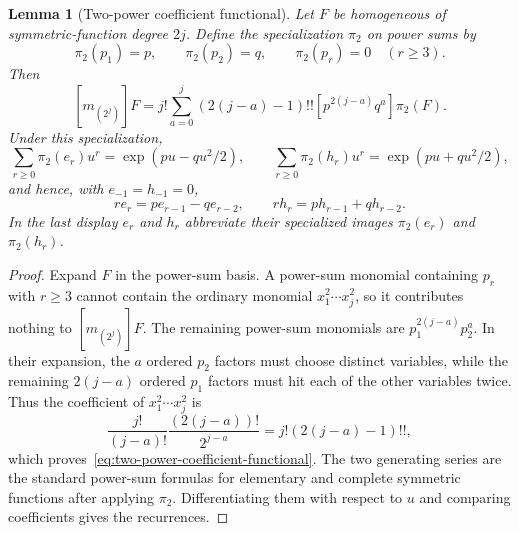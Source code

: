 \documentclass[11pt,reqno]{amsart}
\theoremstyle{plain}
\newtheorem{lemma}[theorem]{Lemma}
\theoremstyle{definition}
\begin{document}
\begin{lemma}[Two-power coefficient functional]
\label{lem:two-power-coefficient-functional}
Let $F$ be homogeneous of symmetric-function degree $2j$.  Define the
specialization $\pi_2$ on power sums by
\[
 \pi_2(p_1)=p,\qquad \pi_2(p_2)=q,\qquad
 \pi_2(p_r)=0\quad(r\geq3).
\]
Then
\begin{equation}
\label{eq:two-power-coefficient-functional}
 [m_{(2^j)}]F
 =j!\sum_{a=0}^{j}(2(j-a)-1)!!
 [p^{2(j-a)}q^a]\pi_2(F).
\end{equation}
Under this specialization,
\[
 \sum_{r\geq0}\pi_2(e_r)u^r
 =\exp(pu-qu^2/2),\qquad
 \sum_{r\geq0}\pi_2(h_r)u^r
 =\exp(pu+qu^2/2),
\]
and hence, with $e_{-1}=h_{-1}=0$,
\[
 r e_r=pe_{r-1}-qe_{r-2},\qquad
 r h_r=ph_{r-1}+qh_{r-2}.
\]
In the last display $e_r$ and $h_r$ abbreviate their specialized images
$\pi_2(e_r)$ and $\pi_2(h_r)$.
\end{lemma}

\begin{proof}
Expand $F$ in the power-sum basis.  A power-sum monomial containing $p_r$
with $r\geq3$ cannot contain the ordinary monomial
$x_1^2\cdots x_j^2$, so it contributes nothing to
$[m_{(2^j)}]F$.  The remaining power-sum monomials are
$p_1^{2(j-a)}p_2^a$.  In their expansion, the $a$ ordered $p_2$ factors must
choose distinct variables, while the remaining $2(j-a)$ ordered $p_1$
factors must hit each of the other variables twice.  Thus the coefficient of
$x_1^2\cdots x_j^2$ is
\[
 \frac{j!}{(j-a)!}\frac{(2(j-a))!}{2^{j-a}}
 =j!(2(j-a)-1)!!,
\]
which proves~\eqref{eq:two-power-coefficient-functional}.  The two generating
series are the standard power-sum formulas for elementary and complete
symmetric functions after applying $\pi_2$.  Differentiating them with
respect to $u$ and comparing coefficients gives the recurrences.
\end{proof}
\end{document}
